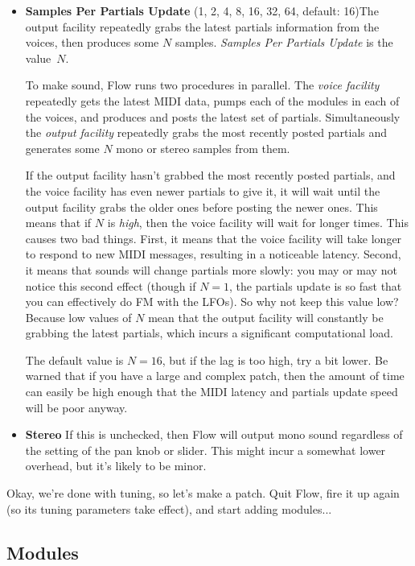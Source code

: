 \documentclass{article}
\begin{document}
\begin{itemize}
\item {\bf Samples Per Partials Update} (1, 2, 4, 8, 16, 32, 64, default: 16)\qquad The output facility repeatedly grabs the latest partials information from the voices, then produces some \(N\) samples.  {\it Samples Per Partials Update} is the value~\(N\).

To make sound, Flow runs two procedures in parallel.  The {\it voice facility} repeatedly gets the latest MIDI data, pumps each of the modules in each of the voices, and produces and posts the latest set of partials.  Simultaneously the {\it output facility} repeatedly grabs the most recently posted partials and generates some \(N\) mono or stereo samples from them. 

If the output facility hasn't grabbed the most recently posted partials, and the voice facility has even newer partials to give it, it will wait until the output facility grabs the older ones before posting the newer ones.  This means that if \(N\) is {\it high}, then the voice facility will wait for longer times.  This causes two bad things.  First, it means that the voice facility will take longer to respond to new MIDI messages, resulting in a noticeable latency.  Second, it means that sounds will change partials more slowly: you may or may not notice this second effect (though if \(N=1\), the partials update is so fast that you can effectively do FM with the LFOs).  So why not keep this value low?  Because low values of \(N\) mean that the output facility will constantly be grabbing the latest partials, which incurs a significant computational load.  

The default value is \(N=16\), but if the lag is too high, try a bit lower.  Be warned that if you have a large and complex patch, then the amount of time can easily be high enough that the MIDI latency and partials update speed will be poor anyway.

\item {\bf Stereo}  If this is unchecked, then Flow will output mono sound regardless of the setting of the pan knob or slider. This might incur a somewhat lower overhead, but it's likely to be minor.
\end{itemize}

Okay, we're done with tuning, so let's make a patch.  Quit Flow, fire it up again (so its tuning parameters take effect), and start adding modules...

\subsection{Modules}
\end{document}
